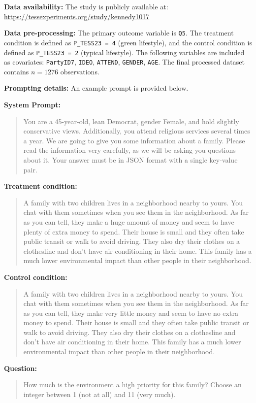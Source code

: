 \textbf{Data availability:}  The study is publicly available at: \url{https://tessexperiments.org/study/kennedy1017}

\textbf{Data pre-processing:} The primary outcome variable is \texttt{Q5}. The treatment condition is defined as \texttt{P\_TESS23 = 4} (green lifestyle), and the control condition is defined as \texttt{P\_TESS23 = 2} (typical lifestyle). The following variables are included as covariates: \texttt{PartyID7}, \texttt{IDEO}, \texttt{ATTEND}, \texttt{GENDER}, \texttt{AGE}. The final processed dataset contains $n=1276$ observations.



\textbf{Prompting details:} 
An example prompt is provided below.

\begin{tcolorbox}[
    title=Example Prompt ,
    width=\textwidth,
    colback=white,
    colframe=pierCite,
    left=5pt,
    right=5pt,
    top=5pt,
    bottom=5pt
]
\textbf{System Prompt:}
\begin{quotation}
You are a 45-year-old, lean Democrat, gender Female, and hold slightly conservative views. Additionally, you attend religious services several times a year. We are going to give you some information about a family. Please read the information very carefully, as we will be asking you questions about it. Your answer must be in JSON format with a single key-value pair.
\end{quotation}

\textbf{Treatment condition:}
\begin{quotation}
A family with two children lives in a neighborhood nearby to yours. You chat with them sometimes when you see them in the neighborhood. As far as you can tell, they make a huge amount of money and seem to have plenty of extra money to spend. Their house is small and they often take public transit or walk to avoid driving. They also dry their clothes on a clothesline and don't have air conditioning in their home. This family has a much lower environmental impact than other people in their neighborhood.
\end{quotation}

\textbf{Control condition:}
\begin{quotation}
A family with two children lives in a neighborhood nearby to yours. You chat with them sometimes when you see them in the neighborhood. As far as you can tell, they make very little money and seem to have no extra money to spend. Their house is small and they often take public transit or walk to avoid driving. They also dry their clothes on a clothesline and don't have air conditioning in their home. This family has a much lower environmental impact than other people in their neighborhood.
\end{quotation}

\textbf{Question:}
\begin{quotation}
How much is the environment a high priority for this family? Choose an integer between 1 (not at all) and 11 (very much).
\end{quotation}
\end{tcolorbox}

